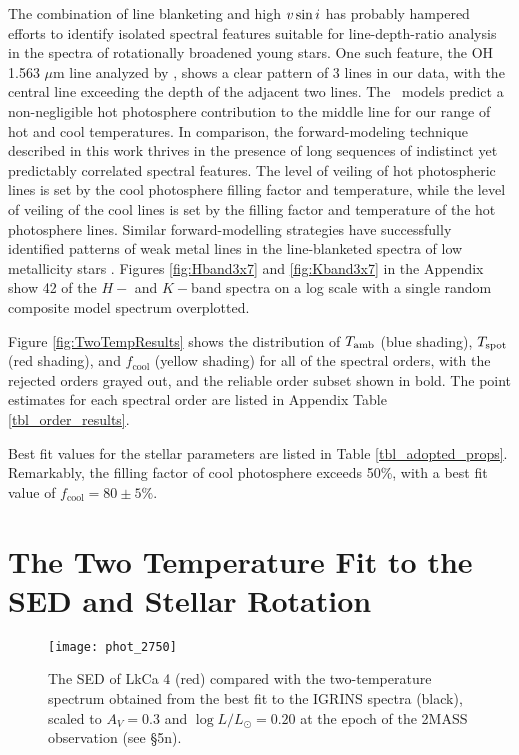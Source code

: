 \documentclass[twocolumn]{emulateapj}%
\begin{document}
The combination of line blanketing and high $v \sin i$ has probably hampered efforts to identify isolated spectral features suitable for line-depth-ratio analysis in the spectra of rotationally broadened young stars.  One such feature, the OH 1.563 $\mu$m line analyzed by \citet{oneal01}, shows a clear pattern of 3 lines in our data, with the central line exceeding the depth of the adjacent two lines.  The \PHOENIX\ models predict a non-negligible hot photosphere contribution to the middle line for our range of hot and cool temperatures.  In comparison, the forward-modeling technique described in this work thrives in the presence of long sequences of indistinct yet predictably correlated spectral features.  The level of veiling of hot photospheric lines is set by the cool photosphere filling factor and temperature, while the level of veiling of the cool lines is set by the filling factor and temperature of the hot photosphere lines. Similar forward-modelling strategies have successfully identified patterns of weak metal lines in the line-blanketed spectra of low metallicity stars \citep{kirby11,kirby15}.  Figures \ref{fig:Hband3x7} and \ref{fig:Kband3x7} in the Appendix show 42 of the $H-$ and $K-$band spectra on a log scale with a single random composite model spectrum overplotted.  

Figure \ref{fig:TwoTempResults} shows the distribution of $T_\textrm{amb}$ (blue shading), $T_\textrm{spot}$ (red shading), and $f_{\mathrm{cool}}$ (yellow shading) for all of the spectral orders, with the rejected orders grayed out, and the reliable order subset shown in bold.  The point estimates for each spectral order are listed in Appendix Table \ref{tbl_order_results}.

Best fit values for the stellar parameters are listed in Table \ref{tbl_adopted_props}.  Remarkably, the filling factor of cool photosphere exceeds 50\%, with a best fit value of $f_{\mathrm{cool}}=80\pm 5 \% $.


\section{The Two Temperature Fit to the SED and Stellar Rotation}\label{sec:GJHsection4}

\begin{figure}
 \centering
 \texttt{[image: phot\_2750]}
\caption{The SED of LkCa 4 (red) compared with the two-temperature spectrum obtained from the best fit to the IGRINS spectra (black), scaled to $A_V=0.3$ and $\log L/L_\odot=0.20$ at the epoch of the 2MASS observation (see \S 5n).}
\label{fig:sed}
\end{figure}
\end{document}
